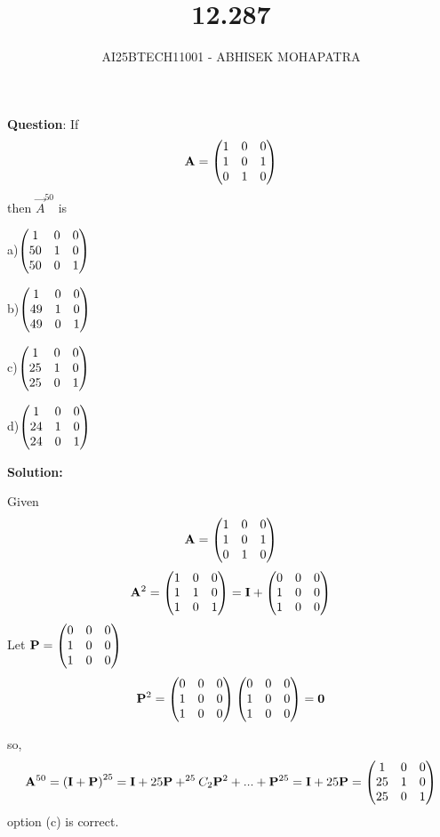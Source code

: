 \documentclass{beamer}
\title{12.287}
\author{AI25BTECH11001 - ABHISEK MOHAPATRA}
\numberwithin{equation}{section}
\begin{document}
{\let\newpage\relax\maketitle}
\renewcommand{\thefigure}{\theenumi}
\renewcommand{\thetable}{\theenumi}


	 	\textbf{Question}:
If$$\mathbf{A} = \begin{pmatrix}1&0&0\\1&0&1\\0&1&0\end{pmatrix}$$then $\vec{A}^{50}$ is

a)$\begin{pmatrix}1&0&0\\50&1&0\\50&0&1\end{pmatrix}$

b)$\begin{pmatrix}1&0&0\\49&1&0\\49&0&1\end{pmatrix}$

c)$\begin{pmatrix}1&0&0\\25&1&0\\25&0&1\end{pmatrix}$

d)$\begin{pmatrix}1&0&0\\24&1&0\\24&0&1\end{pmatrix}$

		\textbf{Solution:}

Given
\begin{align}
		\mathbf{A} = \begin{pmatrix}1&0&0\\1&0&1\\0&1&0\end{pmatrix}
\end{align}
\begin{align}
		\mathbf{A}^2 = \begin{pmatrix}1&0&0\\1&1&0\\1&0&1\end{pmatrix} = \mathbf{I} + \begin{pmatrix}0&0&0\\1&0&0\\1&0&0\end{pmatrix}
\end{align}
Let $\mathbf{P} =\begin{pmatrix}0&0&0\\1&0&0\\1&0&0\end{pmatrix} $ 
\begin{align}
		\mathbf{P}^2 = \begin{pmatrix}0&0&0\\1&0&0\\1&0&0\end{pmatrix}\begin{pmatrix}0&0&0\\1&0&0\\1&0&0\end{pmatrix} = \mathbf{0} 
\end{align}

so,
\begin{align}
	\mathbf{A}^{50} = \left(\mathbf{I}+\mathbf{P}\right)^{25} = \mathbf{I} + 25\mathbf{P} + ^{25}C_2\mathbf{P}^2 + ... + \mathbf{P}^{25} = \mathbf{I} + 25\mathbf{P} = \begin{pmatrix}1&0&0\\25&1&0\\25&0&1\end{pmatrix} 
\end{align}
option (c) is correct.
\end{document}
